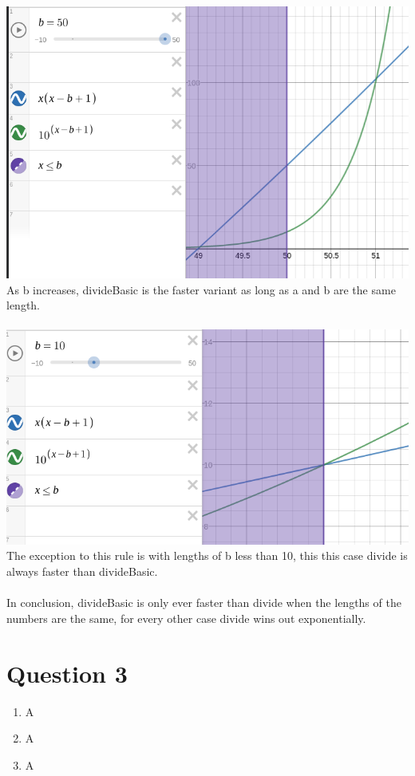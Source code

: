 \documentclass[journal,a4paper]{IEEEtran}
\begin{document}
\begin{enumerate}
	\includegraphics[scale=2]{divide-complexity-2} \\
	As b increases, divideBasic is the faster variant as long as a and b are the same length.
	\\\\
	\includegraphics[scale=0.5]{divide-complexity-3} \\
	The exception to this rule is with lengths of b less than 10, this this case divide is always faster than divideBasic.
	\\\\
	In conclusion, divideBasic is only ever faster than divide when the lengths of the numbers are the same, for every other case divide wins out exponentially.	
\end{enumerate}

\section*{Question 3}
\begin{enumerate}
	\item A
	\item A
	\item A
\end{enumerate}
\end{document}
